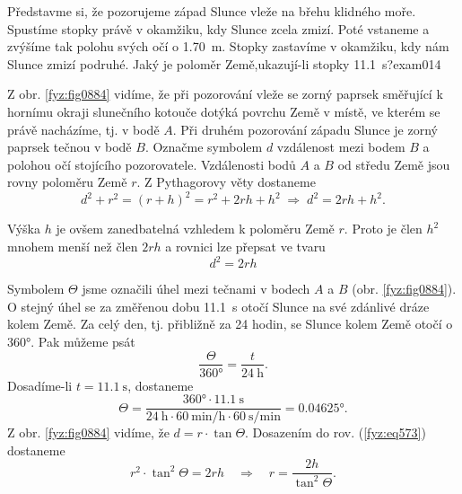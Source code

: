 \begin{fyzexam}{Představme si, že pozorujeme západ Slunce vleže na břehu klidného moře. Spustíme
  stopky právě v okamžiku, kdy Slunce zcela zmizí. Poté vstaneme a zvýšíme tak polohu svých očí o
  \SI{1.70}{\m}. Stopky zastavíme v okamžiku, kdy nám Slunce zmizí podruhé. Jaký je
  poloměr Země,ukazují-li stopky \SI{11.1}{\s}?}{exam014}

  {\centering
   \captionsetup{type=figure}
   \label{fyz:fig0885}
   \par
  }

  Z obr. \ref{fyz:fig0884} vidíme, že při pozorování vleže se zorný paprsek směřující k hornímu
  okraji slunečního kotouče dotýká povrchu Země v místě, ve kterém se právě nacházíme, tj. v bodě
  \(A\). Při druhém pozorování západu Slunce je zorný paprsek tečnou v bodě \(B\). Označme symbolem
  \(d\) vzdálenost mezi bodem \(B\) a polohou očí stojícího pozorovatele. Vzdálenosti bodů \(A\) a
  \(B\) od středu Země jsou rovny poloměru Země \(r\). Z Pythagorovy věty dostaneme
  \begin{equation*}
    d^2 + r^2 = (r + h)^2 = r^2 + 2rh + h^2\;\Rightarrow\; d^2 = 2rh + h^2.
  \end{equation*}

  Výška \(h\) je ovšem zanedbatelná vzhledem k poloměru Země \(r\). Proto je člen \(h^2\) mnohem
  menší než člen \(2rh\) a rovnici lze přepsat ve tvaru
  \begin{equation}\label{fyz:eq573}
    d^2 = 2rh
  \end{equation}

  Symbolem \(\varTheta\) jsme označili úhel mezi tečnami v bodech \(A\) a \(B\) (obr.
  \ref{fyz:fig0884}). O stejný úhel se za změřenou dobu \SI{11.1}{\s} otočí Slunce na své zdánlivé
  dráze kolem Země. Za celý den, tj. přibližně za \num{24} hodin, se Slunce kolem Země otočí o
  \ang{360}. Pak můžeme psát
  \begin{equation*}
    \dfrac{\varTheta}{\ang{360}} = \dfrac{t}{\SI{24}{\hour}}.
  \end{equation*}
  Dosadíme-li \(t = \SI{11.1}{\s}\), dostaneme
  \begin{equation*}
    \varTheta = \dfrac{\ang{360}\cdot\SI{11.1}{\s}}
                      {\SI{24}{\hour}\cdot\SI{60}{\minute\per\hour}\cdot\SI{60}{\s\per\minute}}
              =\ang{0.04625}.
  \end{equation*}
  Z obr. \ref{fyz:fig0884} vidíme, že \(d = r\cdot\tan{\varTheta}\). Dosazením do rov.
  (\ref{fyz:eq573}) dostaneme
  \begin{equation}\label{fyz:eq574}
    r^2\cdot\tan^2{\varTheta} = 2rh\quad\Rightarrow\quad 
    r = \dfrac{2h}{\tan^2{\varTheta}}.
  \end{equation}


\end{fyzexam}
